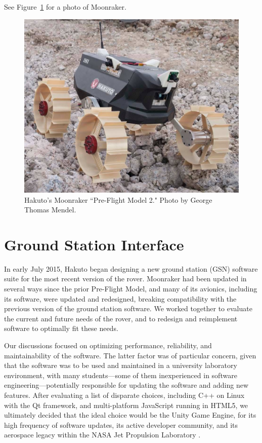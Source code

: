 See Figure~\ref{fig:moonraker} for a photo of Moonraker.

\begin{figure}[h]
\centering
    \includegraphics[width=\columnwidth]{images/moonraker.jpg}
    \caption{Hakuto's Moonraker ``Pre-Flight Model 2." Photo by George Thomas Mendel.}
    \label{fig:moonraker}
\end{figure}

\section{Ground Station Interface}

In early July 2015, Hakuto began designing a new ground station (GSN) software suite for the most recent version of the rover. Moonraker had been updated in several ways since the prior Pre-Flight Model, and many of its avionics, including its software, were updated and redesigned, breaking compatibility with the previous version of the ground station software. We worked together to evaluate the current and future needs of the rover, and to redesign and reimplement software to optimally fit these needs.

Our discussions focused on optimizing performance, reliability, and maintainability of the software. The latter factor was of particular concern, given that the software was to be used and maintained in a university laboratory environment, with many students---some of them inexperienced in software engineering---potentially responsible for updating the software and adding new features. After evaluating a list of disparate choices, including C++ on Linux with the Qt framework, and multi-platform JavaScript running in HTML5, we ultimately decided that the ideal choice would be the Unity Game Engine, for its high frequency of software updates, its active developer community, and its aerospace legacy within the NASA Jet Propulsion Laboratory \cite{jplunity}. 

